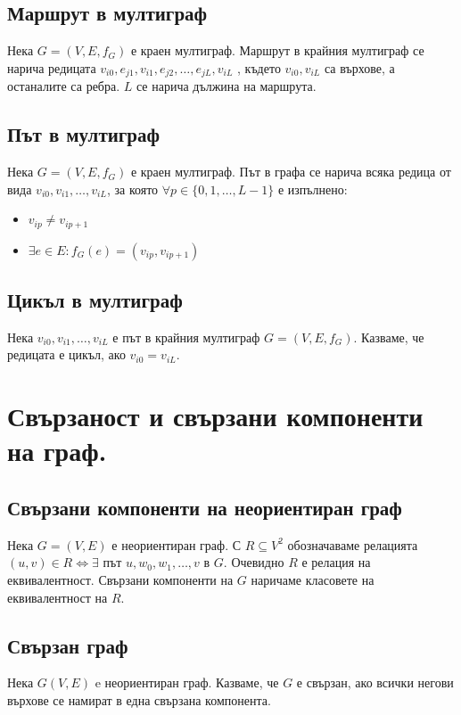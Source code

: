 \documentclass[fleqn,12pt]{article}
\begin{document}
\begin{flushleft}
\subsection{Маршрут в мултиграф}
Нека $G = (V, E, f_G)$ е краен мултиграф. Маршрут в крайния мултиграф се нарича
редицата $v_{i0}, e_{j1}, v_{i1}, e_{j2} , \dots , e_{jL} , v_{iL}$ , където $v_{i0}, v_{iL}$ са върхове, а останалите са ребра. 
$L$ се нарича дължина на маршрута.

\subsection{Път в мултиграф}
Нека $G = (V, E, f_G)$ е краен мултиграф. Път в графа се нарича всяка редица от вида
$v_{i0}, v_{i1}, \dots, v_{iL}$, за която $\forall p \in \{ 0, 1, \dots, L - 1 \}$ е изпълнено:
\begin{itemize}
	\item $v_{ip} \neq v_{ip+1}$
	\item $\exists e \in E : f_G(e) = (v_{ip}, v_{ip+1})$
\end{itemize}

\subsection{Цикъл в мултиграф}
Нека $v_{i0}, v_{i1}, \dots, v_{iL}$ е път в крайния мултиграф $G = (V, E, f_G)$.
Казваме, че редицата е цикъл, ако $v_{i0} = v_{iL}$.

\section{Свързаност и свързани компоненти на граф.} 

\subsection{Свързани компоненти на неориентиран граф}
Нека $G = (V, E)$ е неориентиран граф. 
С $R \subseteq V^2$ обозначаваме релацията $ (u, v) \in R \Leftrightarrow \exists $ път $u, w_0, w_1, \dots, v$ в $G$.
Очевидно $R$ е релация на еквивалентност. Свързани компоненти на $G$ наричаме класовете на еквивалентност на $R$.

\subsection{Свързан граф}
Нека $G(V, E)$ e неориентиран граф. Казваме, че $G$ е свързан, ако всички негови върхове
се намират в една свързана компонента.


\end{flushleft}
\end{document}
